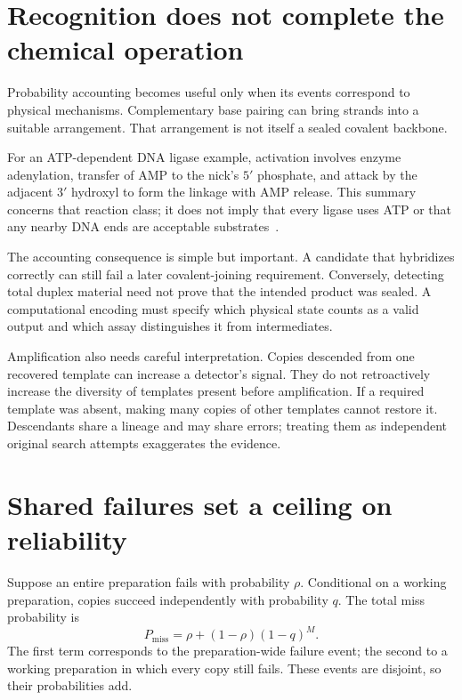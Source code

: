\section{Recognition does not complete the chemical operation}

Probability accounting becomes useful only when its events correspond to physical mechanisms. Complementary base pairing can bring strands into a suitable arrangement. That arrangement is not itself a sealed covalent backbone.


For an ATP-dependent DNA ligase example, activation involves enzyme adenylation, transfer of AMP to the nick's $5'$ phosphate, and attack by the adjacent $3'$ hydroxyl to form the linkage with AMP release. This summary concerns that reaction class; it does not imply that every ligase uses ATP or that any nearby DNA ends are acceptable substrates~\cite{neb}.

The accounting consequence is simple but important. A candidate that hybridizes correctly can still fail a later covalent-joining requirement. Conversely, detecting total duplex material need not prove that the intended product was sealed. A computational encoding must specify which physical state counts as a valid output and which assay distinguishes it from intermediates.

Amplification also needs careful interpretation. Copies descended from one recovered template can increase a detector's signal. They do not retroactively increase the diversity of templates present before amplification. If a required template was absent, making many copies of other templates cannot restore it. Descendants share a lineage and may share errors; treating them as independent original search attempts exaggerates the evidence.

\section{Shared failures set a ceiling on reliability}

Suppose an entire preparation fails with probability $\rho$. Conditional on a working preparation, copies succeed independently with probability $q$. The total miss probability is
\begin{equation}
P_{\mathrm{miss}}=\rho+(1-\rho)(1-q)^M. \label{eq:common}
\end{equation}
The first term corresponds to the preparation-wide failure event; the second to a working preparation in which every copy still fails. These events are disjoint, so their probabilities add.

